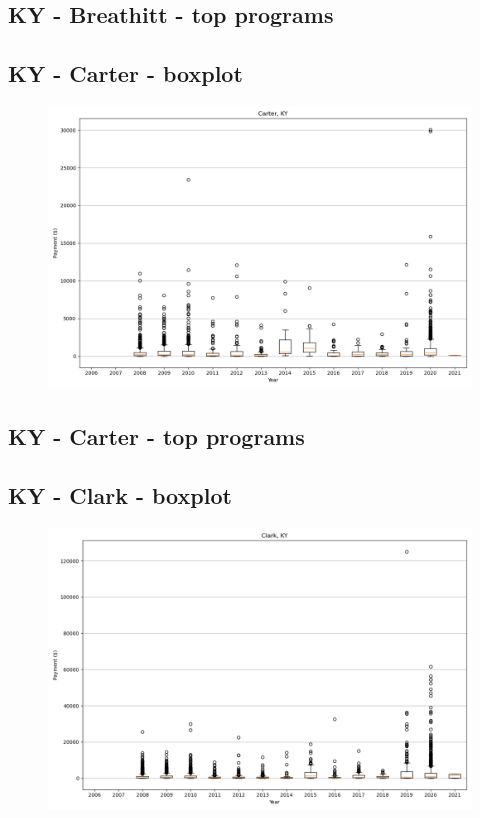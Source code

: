 \subsection*{KY - Breathitt - top programs}

\newpage
\subsection*{KY - Carter - boxplot}
\begin{figure}[h]
\centering
\includegraphics[width=7in]{../output/boxplots/counties/Carter-KY_boxplot.png}
\end{figure}


\subsection*{KY - Carter - top programs}

\newpage
\subsection*{KY - Clark - boxplot}
\begin{figure}[h]
\centering
\includegraphics[width=7in]{../output/boxplots/counties/Clark-KY_boxplot.png}
\end{figure}


